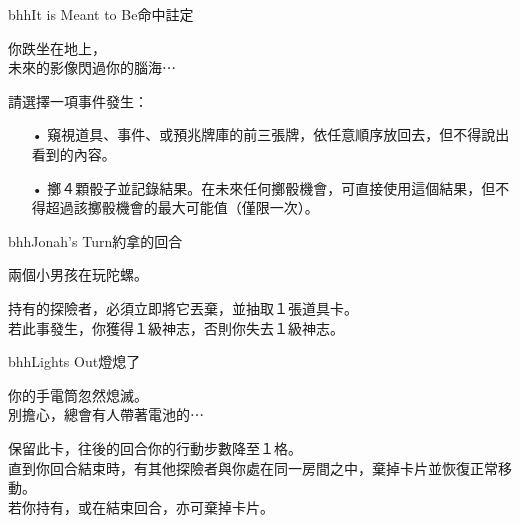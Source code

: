 \linebreak[0]%
\begin{EventCard}{bhh}{It is Meant to Be}{命中註定}
  \begin{CardStory}
    你跌坐在地上，\\
    未來的影像閃過你的腦海⋯
  \end{CardStory}
  請選擇一項事件發生：
  \begin{itemize}
    \item[•] 窺視道具、事件、或預兆牌庫的前三張牌，依任意順序放回去，但不得說出看到的內容。
    \item[•] 擲４顆骰子並記錄結果。在未來任何擲骰機會，可直接使用這個結果，但不得超過該擲骰機會的最大可能值（僅限一次）。
  \end{itemize}
\end{EventCard}%
\linebreak[0]%
\begin{EventCard}{bhh}{Jonah’s Turn}{約拿的回合}
  \begin{CardStory}
    兩個小男孩在玩陀螺。\\
\end{CardStory}
  持有的探險者，必須立即將它丟棄，並抽取１張道具卡。\\[0.5em]
  若此事發生，你獲得１級神志，否則你失去１級神志。\\[0.5em]
\end{EventCard}%
\linebreak[0]%
\begin{EventCard}{bhh}{Lights Out}{燈熄了}
  \begin{CardStory}
    你的手電筒忽然熄滅。\\
    別擔心，總會有人帶著電池的⋯
  \end{CardStory}
  保留此卡，往後的回合你的行動步數降至１格。\\[0.5em]
  直到你回合結束時，有其他探險者與你處在同一房間之中，棄掉卡片並恢復正常移動。\\[0.5em]
  若你持有，或在結束回合，亦可棄掉卡片。\\[0.5em]
\end{EventCard}%
\linebreak[0]%
